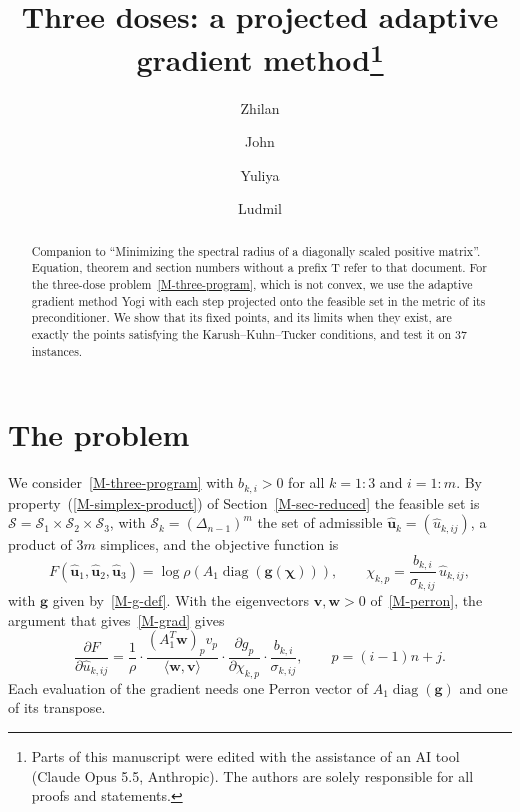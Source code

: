 \documentclass[11pt]{article}
\title{Three doses: a projected adaptive gradient method\thanks{Parts of this manuscript were edited with the assistance of an AI tool (Claude Opus 5.5, Anthropic). The authors are solely responsible for all proofs and statements.}}
\author{Zhilan \and John \and Yuliya \and Ludmil}
\date{}
\theoremstyle{plain}
\theoremstyle{remark}
\numberwithin{equation}{section}
\begin{document}
\maketitle

\begin{abstract}
Companion to ``Minimizing the spectral radius of a diagonally scaled positive
matrix''. Equation, theorem and section numbers without a prefix T refer to
that document. For the three-dose problem~\eqref{M-three-program}, which is not
convex, we use the adaptive gradient method Yogi with each step projected onto
the feasible set in the metric of its preconditioner. We show that its fixed
points, and its limits when they exist, are exactly the points satisfying the
Karush--Kuhn--Tucker conditions, and test it on $37$ instances.
\end{abstract}

\section{The problem}\label{t-problem}

We consider~\eqref{M-three-program} with $b_{k,i}>0$ for all $k=1:3$ and
$i=1:m$. By property~(\ref{M-simplex-product}) of Section~\ref{M-sec-reduced}
the feasible set is
$\mathcal{S}=\mathcal{S}_1\times\mathcal{S}_2\times\mathcal{S}_3$, with
$\mathcal{S}_k=\left(\Delta_{n-1}\right)^m$ the set of admissible
$\widehat{\bm u}_k=\left(\widehat u_{k,ij}\right)$, a product of $3m$
simplices, and the objective function is
\begin{equation}\label{t-F}
F(\widehat{\bm u}_1,\widehat{\bm u}_2,\widehat{\bm u}_3)
=\log\rho\left(A_1\operatorname{diag}\left(\bm g\left(\bm\chi\right)\right)\right),
\qquad \chi_{k,p}=\frac{b_{k,i}}{\sigma_{k,ij}}\,\widehat u_{k,ij},
\end{equation}
with $\bm g$ given by~\eqref{M-g-def}. With the eigenvectors $\bm v,\bm w>0$
of~\eqref{M-perron}, the argument that gives~\eqref{M-grad} gives
\begin{equation}\label{t-grad}
\frac{\partial F}{\partial\widehat u_{k,ij}}
=\frac{1}{\rho}\cdot\frac{\left(A_1^T\bm w\right)_pv_p}{\langle\bm w,\bm v\rangle}
\cdot\frac{\partial g_p}{\partial \chi_{k,p}}\cdot\frac{b_{k,i}}{\sigma_{k,ij}},
\qquad p=(i-1)n+j .
\end{equation}
Each evaluation of the gradient needs one Perron vector of
$A_1\operatorname{diag}(\bm g)$ and one of its transpose.
\end{document}
